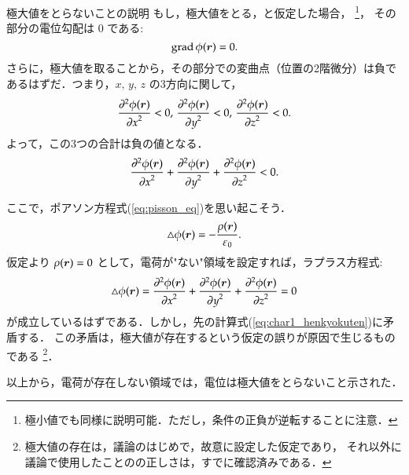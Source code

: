             \begin{mysmallsec}{極大値をとらないことの説明}
            もし，極大値をとる，と仮定した場合，
                \footnote{
                    極小値でも同様に説明可能．ただし，条件の正負が逆転することに注意．
                }，
            その部分の電位勾配は 0 である:
                \begin{equation*}
                    \mathrm{grad}\, \phi(\boldsymbol{r}) = 0.
                \end{equation*}
            さらに，極大値を取ることから，その部分での変曲点（位置の2階微分）は負で
            あるはずだ．つまり，$x,\,y,\,z$ の3方向に関して，
                \begin{equation*}
                        \frac{{\partial}^{2} \phi(\boldsymbol{r})}{{\partial x}^{2}} < 0
                    ,\, \frac{{\partial}^{2} \phi(\boldsymbol{r})}{{\partial y}^{2}} < 0
                    ,\, \frac{{\partial}^{2} \phi(\boldsymbol{r})}{{\partial z}^{2}} < 0.
                \end{equation*}
            よって，この3つの合計は負の値となる．
                \begin{align}\label{eq:char1_henkyokuten}
                    \frac{{\rd}^{2} \phi(\br)}{{\rd x}^{2}}
                      + \frac{{\rd}^{2} \phi(\br)}{{\rd y}^{2}}
                      + \frac{{\rd}^{2} \phi(\br)}{{\rd z}^{2}}
                    < 0.
                \end{align}

            ここで，ポアソン方程式(\ref{eq:pisson_eq})を思い起こそう．
                \begin{align*}
                    \triangle \phi(\boldsymbol{r}) = - \frac{\rho(\boldsymbol{r})}{\varepsilon_{0}}.
                \end{align*}
            仮定より $\rho(\boldsymbol{r})=0$ として，電荷が"ない"領域を設定すれば，ラプラス方程式:
                \begin{align*}
                    \triangle \phi(\boldsymbol{r})
                   =  \frac{{\partial}^{2} \phi(\boldsymbol{r})}{{\partial x}^{2}}
                      + \frac{{\partial}^{2} \phi(\boldsymbol{r})}{{\partial y}^{2}}
                      + \frac{{\partial}^{2} \phi(\boldsymbol{r})}{{\partial z}^{2}}
                   =  0
                \end{align*}
            が成立しているはずである．しかし，先の計算式(\ref{eq:char1_henkyokuten})に矛盾する．
            この矛盾は，極大値が存在するという仮定の誤りが原因で生じるものである
                \footnote{
                    極大値の存在は，議論のはじめで，故意に設定した仮定であり，
                    それ以外に議論で使用したことのの正しさは，すでに確認済みである．
                }．

            以上から，電荷が存在しない領域では，電位は極大値をとらないこと示された．
            \end{mysmallsec}

